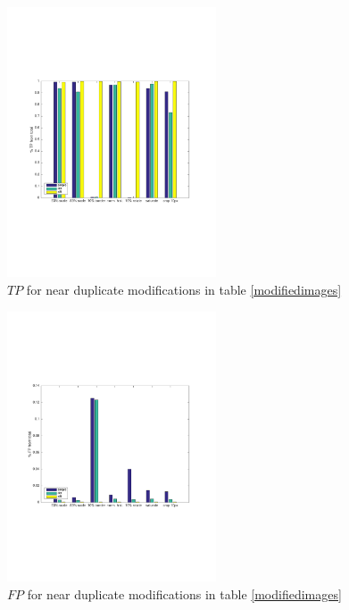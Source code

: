 \documentclass[english,12pt,a4paper,pdftex,elec,utf8]{aaltothesis}
\begin{document}
\begin{figure}[htb]
\begin{center}
\includegraphics[height=8cm]{figures/tpBar}
\end{center}
\caption{ $TP$ for near duplicate modifications in table \ref{modifiedimages} }
\label{tptotal}
\end{figure}


\begin{figure}[htb]
\begin{center}
\includegraphics[height=8cm]{figures/fpBar}
\end{center}
\caption{ $FP$ for near duplicate modifications in table \ref{modifiedimages} }
\label{fptotal}
\end{figure}
\end{document}
